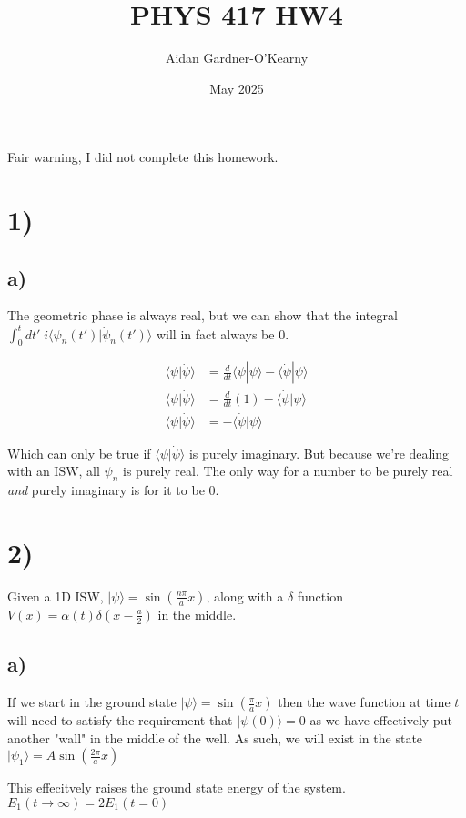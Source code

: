 \documentclass{article}
\title{PHYS 417 HW4}
\author{Aidan Gardner-O'Kearny}
\date{May 2025}
\newcommand{\braket}[1]{\langle#1\rangle}
\newcommand{\bra}[1]{|#1\rangle}
\begin{document}
\maketitle

Fair warning, I did not complete this homework.

\section*{1)}
\subsection*{a)}
The geometric phase is always real, but we can show that the integral $\int_0^{t}dt'\;i\braket{\psi_n(t')|\dot{\psi}_n(t')}$ will in fact always be 0.

\begin{align*}
    \braket{\psi|\dot{\psi}}&=\frac{d}{dt}\braket{\psi|\psi}-\braket{\dot{\psi}|\psi}\\[1em]
    \braket{\psi|\dot{\psi}}&=\frac{d}{dt}(1)-\braket{\dot{\psi}|\psi}\\[1em]
    \braket{\psi|\dot{\psi}}&=-\braket{\dot{\psi}|\psi}
\end{align*}

Which can only be true if $\braket{\psi|\dot{\psi}}$ is purely imaginary. But because we're dealing with an ISW, all $\psi_n$ is purely real. The only way for a number to be purely real \textit{and} purely imaginary is for it to be $0$.  


\section*{2)}
Given a 1D ISW, $\bra{\psi}=\sin(\frac{n\pi}{a}x)$, along with a $\delta$ function $V(x)=\alpha(t)\delta(x-\frac{a}{2})$ in the middle.

\subsection*{a)}

If we start in the ground state $\bra{\psi}=\sin(\frac{\pi}{a}x)$ then the wave function at time $t$ will need to satisfy the requirement that $\bra{\psi(0)}=0$ as we have effectively put another "wall" in the middle of the well. As such, we will exist in the state $\bra{\psi_1}=A\sin{(\frac{2\pi}{a}x)}$

This effecitvely raises the ground state energy of the system. $E_1(t\rightarrow\infty)=2E_1(t=0)$
\end{document}

